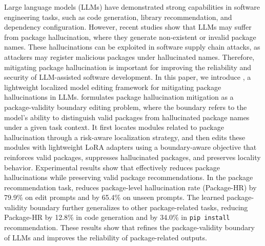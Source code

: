 Large language models (LLMs) have demonstrated strong capabilities in software engineering tasks, such as code generation, library recommendation, and dependency configuration. 
However, recent studies show that LLMs may suffer from package hallucination, where they generate non-existent or invalid package names.
These hallucinations can be exploited in software supply chain attacks, as attackers may register malicious packages under hallucinated names. 
Therefore, mitigating package hallucination is important for improving the reliability and security of LLM-assisted software development.
In this paper, we introduce \appname, a lightweight localized model editing framework for mitigating package hallucinations in LLMs. \appname formulates package hallucination mitigation as a package-validity boundary editing problem, where the boundary refers to the model's ability to distinguish valid packages from hallucinated package names under a given task context.
It first locates modules related to package hallucination through a risk-aware localization strategy, and then edits these modules with lightweight LoRA adapters using a boundary-aware objective that reinforces valid packages, suppresses hallucinated packages, and preserves locality behavior.
Experimental results show that \appname effectively reduces package hallucinations while preserving valid package recommendations. In the package recommendation task, \appname reduces package-level hallucination rate (Package-HR) by 79.9\% on edit prompts and by 65.4\% on unseen prompts. The learned package-validity boundary further generalizes to other package-related tasks, reducing Package-HR by 12.8\% in code generation and by 34.0\% in \texttt{pip install} recommendation.
These results show that \appname refines the package-validity boundary of LLMs and improves the reliability of package-related outputs.